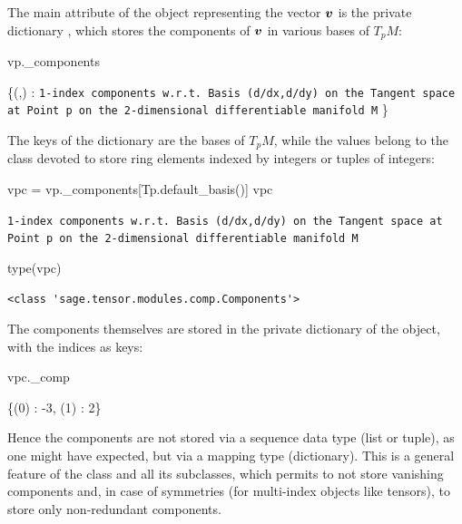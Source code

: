 The main attribute of the object  representing the vector $\bm{v}$ is the
private dictionary , which stores the components of $\bm{v}$ in various bases of $T_p M$:
\begin{NBin}
vp._components
\end{NBin}
\begin{NBoutM}
\left\{\left(,\right) :
\mbox{\texttt{1-index components w.r.t.~Basis (d/dx,d/dy) on the Tangent space at Point p on the 2-dimensional differentiable manifold M}}
\right\}
\end{NBoutM}
The keys of the dictionary  are the bases of $T_p M$, while the values belong to the class  devoted to store ring elements indexed by integers or tuples of integers:
\begin{NBin}
vpc = vp._components[Tp.default_basis()]
vpc
\end{NBin}
\begin{NBout}
\texttt{1-index components w.r.t. Basis (d/dx,d/dy) on the Tangent space at Point p
on the 2-dimensional differentiable manifold M}
\end{NBout}
\begin{NBin}
type(vpc)
\end{NBin}
\begin{NBout}
\begin{verbatim}
<class 'sage.tensor.modules.comp.Components'>
\end{verbatim}
\end{NBout}
The components themselves are stored in the private dictionary  of the  object, with the indices as keys:
\begin{NBin}
vpc._comp
\end{NBin}
\begin{NBoutM}
\left\{\left(0\right) : -3, \left(1\right) : 2\right\}
\end{NBoutM}
Hence the components are not stored via a sequence data type (list or tuple), as
one might have expected, but via a mapping type (dictionary). This is a general
feature of the class  and all its subclasses, which permits
to not store vanishing components and, in case of symmetries (for multi-index
objects like tensors), to store only non-redundant components.


